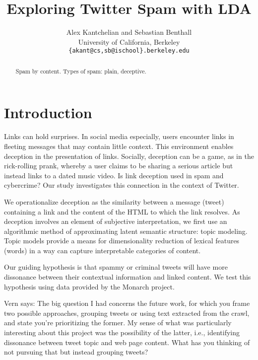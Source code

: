 \documentclass[times, 11pt, twocolumn]{article}
\begin{document}
\title{Exploring Twitter Spam with LDA}
\author{Alex Kantchelian and Sebastian Benthall \\
University of California, Berkeley \\
 \texttt{\{akant@cs,sb@ischool\}.berkeley.edu}\\
 }
 \date{}

\maketitle

\begin{abstract}
	Spam by content. Types of spam: plain, deceptive.
\end{abstract}

\section{Introduction}

Links can hold surprises.
In social media especially, users encounter links in fleeting messages that may contain little context.
This environment enables deception in the presentation of links.
Socially, deception can be a game, as in the rick-rolling prank, whereby a user claims to be sharing a serious article but instead links to a dated music video.
Is link deception used in spam and cybercrime?
Our study investigates this connection in the context of Twitter.

We operationalize deception as the similarity between a message (tweet) containing a link and the content of the HTML to which the link resolves.
As deception involves an element of subjective interpretation, we first use an algorithmic method of approximating latent semantic structure: topic modeling.
Topic models provide a means for dimensionality reduction of lexical features (words) in a way can capture interpretable categories of content.

Our guiding hypothesis is that spammy or criminal tweets will have more dissonance between their contextual information and linked content.
We test this hypothesis using data provided by the Monarch project.

Vern says: The big question I had concerns
the future work, for which you frame two possible approaches, grouping
tweets or using text extracted from the crawl, and state you're prioritizing
the former.  My sense of what was particularly interesting about this
project was the possibility of the latter, i.e., identifying dissonance
between tweet topic and web page content.  What has you thinking of not
pursuing that but instead grouping tweets?
\end{document}
